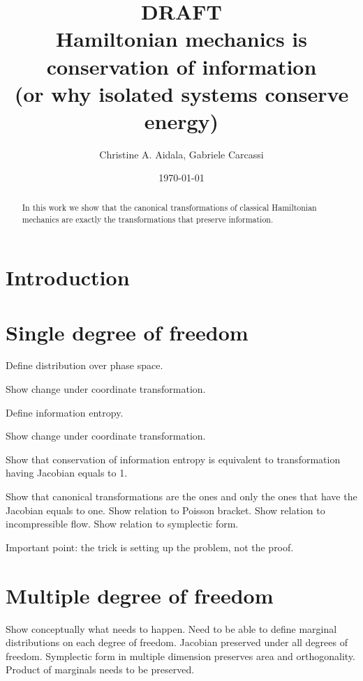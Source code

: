 \documentclass[aps,pra,10pt,twocolumn,floatfix,nofootinbib]{revtex4-1}
\begin{document}
\title{DRAFT \\ Hamiltonian mechanics is conservation of information \\ (or why isolated systems conserve energy)}
\author{Christine A. Aidala, Gabriele Carcassi}



\date{\today}

\begin{abstract}
In this work we show that the canonical transformations of classical Hamiltonian mechanics are exactly the transformations that preserve information.
\end{abstract}

\maketitle

\section{Introduction}

\section{Single degree of freedom}
Define distribution over phase space.

Show change under coordinate transformation.

Define information entropy.

Show change under coordinate transformation.

Show that conservation of information entropy is equivalent to transformation having Jacobian equals to 1.

Show that canonical transformations are the ones and only the ones that have the Jacobian equals to one. Show relation to Poisson bracket. Show relation to incompressible flow. Show relation to symplectic form.

Important point: the trick is setting up the problem, not the proof.

\section{Multiple degree of freedom}

Show conceptually what needs to happen. Need to be able to define marginal distributions on each degree of freedom. Jacobian preserved under all degrees of freedom. Symplectic form in multiple dimension preserves area and orthogonality. Product of marginals needs to be preserved.
\end{document}
